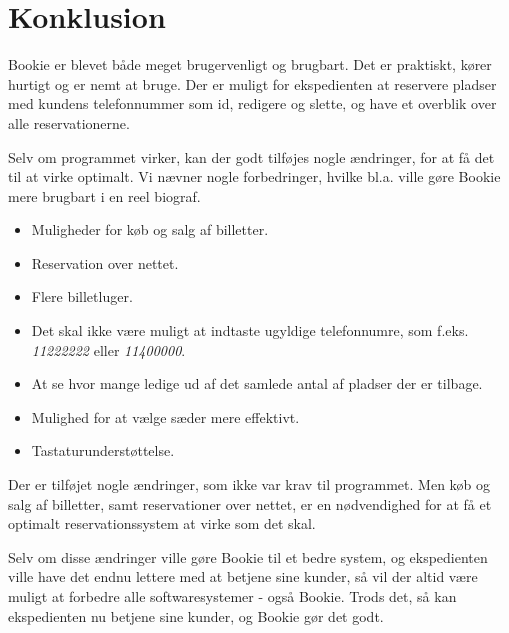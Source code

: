 \chapter{Konklusion}

Bookie er blevet både meget brugervenligt og brugbart. Det er praktiskt, kører hurtigt og er nemt at bruge. Der er muligt for ekspedienten at reservere pladser med kundens telefonnummer som id, redigere og slette, og have et overblik over alle reservationerne. 

Selv om programmet virker, kan der godt tilføjes nogle ændringer, for at få det til at virke optimalt. Vi nævner nogle forbedringer, hvilke bl.a. ville gøre Bookie mere brugbart i en reel biograf.

\begin{itemize}
  \item Muligheder for køb og salg af billetter.
  
  \item Reservation over nettet.
  
  \item Flere billetluger.
  
  \item Det skal ikke være muligt at indtaste ugyldige telefonnumre, som f.eks. \textit{
  11222222} eller \textit{11400000}.
  \item At se hvor mange ledige ud af det samlede antal af pladser der er tilbage.
  \item Mulighed for at vælge sæder mere effektivt.
  
  \item Tastaturunderstøttelse.
  

\end{itemize}
Der er tilføjet nogle ændringer, som ikke var krav til programmet. Men køb og salg af billetter, samt reservationer over nettet, er en nødvendighed for at få et optimalt reservationssystem at virke som det skal. 

Selv om disse ændringer ville gøre Bookie til et bedre system, og ekspedienten ville have det endnu lettere med at betjene sine kunder, så vil der altid være muligt at forbedre alle softwaresystemer - også Bookie. 
Trods det, så kan ekspedienten nu betjene sine kunder, og Bookie gør det godt.





